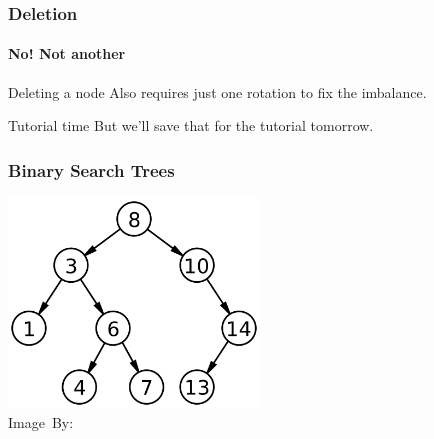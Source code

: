 \begin{frame}
	\frametitle{Deletion}
	\framesubtitle{No! Not another}
		\begin{block}{Deleting a node}
			Also requires just one rotation to fix the imbalance.
		\end{block}	
		\pause
			\begin{block}{Tutorial time}
			  But we'll save that for the tutorial tomorrow.	
			\end{block}	
\end{frame}


\begin{frame}
	\frametitle{Binary Search Trees}
	\begin{center}
		\includegraphics[width=0.5\textwidth]{images/btree.png}\\
		\hspace*{15pt}\hbox{\scriptsize Image By:}
	\end{center}
\end{frame}

